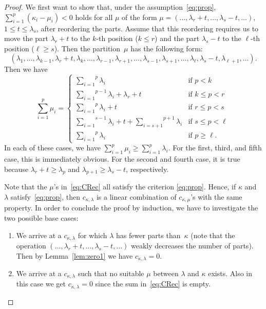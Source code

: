 \documentclass[10pt,oneside,american]{amsart}
\numberwithin{equation}{section}
\numberwithin{figure}{section}
\theoremstyle{plain}
\theoremstyle{definition}
\theoremstyle{remark}
\theoremstyle{plain}
\theoremstyle{definition}
\theoremstyle{plain}
\theoremstyle{plain}
\begin{document}
\begin{proof}
  We first want to show that, under the assumption~\eqref{eq:prop},
  $\sum_{i=1}^p(\kappa_i-\mu_i)<0$ holds for all $\mu$ of the form
  $\mu=(\dots,\lambda_r+t,\dots,\lambda_s-t,\dots)$, $1\leq t\leq \lambda_s$,
  after reordering the parts. Assume that this reordering requires us
  to move the part $\lambda_r+t$ to the $k$-th position ($k\leq r$) and
  the part $\lambda_s-t$ to the $\ell$-th position ($\ell\geq s$). Then
  the partition~$\mu$ has the following form:
  \[
    (\lambda_1,\dots,\lambda_{k-1},\lambda_r+t,\lambda_k,\dots,
    \lambda_{r-1},\lambda_{r+1},\dots,\lambda_{s-1},\lambda_{s+1},\dots,
    \lambda_{\ell},\lambda_s-t,\lambda_{\ell+1},\dots).
  \]
  Then we have
  \[
    \sum_{i=1}^p \mu_i =
    \begin{cases}
      \overset{p}{\underset{i=1}{\sum}}\lambda_i & \text{if } p<k \\
      \overset{p-1}{\underset{i=1}{\sum}}\lambda_i + \lambda_r+t & \text{if } k\leq p<r \\
      \overset{p}{\underset{i=1}{\sum}}\lambda_i + t & \text{if } r\leq p<s \\
      \overset{s-1}{\underset{i=1}{\sum}}\lambda_i + t +\overset{p+1}{\underset{i=s+1}{\sum}}\lambda_i & \text{if } s\leq p<\ell \\
      \overset{p}{\underset{i=1}{\sum}}  \lambda_i & \text{if } p\geq\ell.
    \end{cases}
  \]
  In each of these cases, we have $\sum_{i=1}^p \mu_i \geq \sum_{i=1}^p
  \lambda_i$.  For the first, third, and fifth case, this is immediately
  obvious. For the second and fourth case, it is true because
  $\lambda_r+t\geq\lambda_p$ and $\lambda_{p+1}\geq\lambda_s-t$, respectively.

  Note that the $\mu$'s in~\eqref{eq:CRec} all satisfy the criterion \eqref{eq:prop}.
  Hence, if $\kappa$ and $\lambda$ satisfy~\eqref{eq:prop}, then
  $c_{\kappa,\lambda}$ is a linear combination of $c_{\kappa,\mu}$'s with the
  same property. In order to conclude the proof by induction, we have to
  investigate the two possible base cases:
  \begin{enumerate}
  \item We arrive at a $c_{\kappa,\lambda}$ for which $\lambda$ has fewer
    parts than~$\kappa$ (note that the operation
    $(\dots,\lambda_r+t,\dots,\lambda_s-t,\dots)$ weakly decreases the number
    of parts). Then by Lemma~\ref{lem:zero1} we have $c_{\kappa,\lambda}=0$.
  \item We arrive at a $c_{\kappa,\lambda}$ such that no suitable $\mu$
    between $\lambda$ and $\kappa$ exists.  Also in this case we get
    $c_{\kappa,\lambda}=0$ since the sum in~\eqref{eq:CRec} is empty.
  \end{enumerate}
\end{proof}
\end{document}
